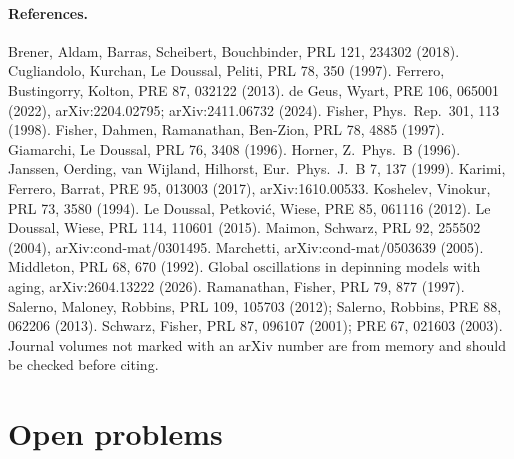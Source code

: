 \documentclass[10pt,a4paper]{article}
\begin{document}
\paragraph{References.}
{\footnotesize
Brener, Aldam, Barras, Scheibert, Bouchbinder, PRL 121, 234302 (2018).
Cugliandolo, Kurchan, Le Doussal, Peliti, PRL 78, 350 (1997).
Ferrero, Bustingorry, Kolton, PRE 87, 032122 (2013).
de Geus, Wyart, PRE 106, 065001 (2022), arXiv:2204.02795; arXiv:2411.06732 (2024).
Fisher, Phys.\ Rep.\ 301, 113 (1998).
Fisher, Dahmen, Ramanathan, Ben-Zion, PRL 78, 4885 (1997).
Giamarchi, Le Doussal, PRL 76, 3408 (1996).
Horner, Z.\ Phys.\ B (1996).
Janssen, Oerding, van Wijland, Hilhorst, Eur.\ Phys.\ J.\ B 7, 137 (1999).
Karimi, Ferrero, Barrat, PRE 95, 013003 (2017), arXiv:1610.00533.
Koshelev, Vinokur, PRL 73, 3580 (1994).
Le Doussal, Petkovi\'c, Wiese, PRE 85, 061116 (2012).
Le Doussal, Wiese, PRL 114, 110601 (2015).
Maimon, Schwarz, PRL 92, 255502 (2004), arXiv:cond-mat/0301495.
Marchetti, arXiv:cond-mat/0503639 (2005).
Middleton, PRL 68, 670 (1992).
Global oscillations in depinning models with aging, arXiv:2604.13222 (2026).
Ramanathan, Fisher, PRL 79, 877 (1997).
Salerno, Maloney, Robbins, PRL 109, 105703 (2012); Salerno, Robbins, PRE 88, 062206 (2013).
Schwarz, Fisher, PRL 87, 096107 (2001); PRE 67, 021603 (2003).
Journal volumes not marked with an arXiv number are from memory and should be checked before citing.
}

\section{Open problems}
\end{document}
